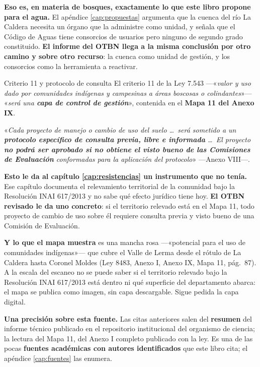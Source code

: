 \textbf{Eso es, en materia de bosques, exactamente lo que este libro propone para el agua.} El
apéndice \ref{cap:propuestas} argumenta que la cuenca del río La Caldera necesita un órgano que
la administre como unidad, y señala que el Código de Aguas tiene consorcios de usuarios pero
ninguno de segundo grado constituido. \textbf{El informe del OTBN llega a la misma conclusión
por otro camino y sobre otro recurso}: la cuenca como unidad de gestión, y los consorcios como
la herramienta a reactivar.

\begin{ficha}{Criterio 11 y protocolo de consulta}
El criterio 11 de la Ley 7.543 ---«\textit{valor y uso dado por comunidades indígenas y
campesinas a áreas boscosas o colindantes}»--- «\textit{será una \textbf{capa de control de
gestión}}», contenida en el \textbf{Mapa 11 del Anexo IX}.

«\textit{Cada proyecto de manejo o cambio de uso del suelo \ldots\ será sometido a un
\textbf{protocolo específico de consulta previa, libre e informada} \ldots\ El proyecto
\textbf{no podrá ser aprobado si no obtiene el visto bueno de las Comisiones de Evaluación}
conformadas para la aplicación del protocolo}» ---Anexo VIII---.
\end{ficha}

\begin{cautela}
\textbf{Esto le da al capítulo \ref{cap:resistencias} un instrumento que no tenía.} Ese capítulo
documenta el relevamiento territorial de la comunidad bajo la Resolución INAI 617/2013 y no
sabe qué efecto jurídico tiene hoy. \textbf{El OTBN revisado le da uno concreto}: si el
territorio relevado está en el Mapa 11, todo proyecto de cambio de uso sobre él requiere
consulta previa y visto bueno de una Comisión de Evaluación.

\textbf{Y lo que el mapa muestra} es una mancha rosa ---«potencial para el uso de comunidades
indígenas»--- que cubre el Valle de Lerma desde el rótulo de La Caldera hasta Coronel Moldes
(Ley 8483, Anexo I, Anexo IX, Mapa 11, pág.\ 87). A la escala del escaneo no se puede saber si
el territorio relevado bajo la Resolución INAI 617/2013 está dentro ni qué superficie del
departamento abarca: el mapa se publica como imagen, sin capa descargable. Sigue pedida la capa
digital.

\textbf{Una precisión sobre esta fuente.} Las citas anteriores salen del \textbf{resumen} del
informe técnico publicado en el repositorio institucional del organismo de ciencia; la lectura
del Mapa 11, del Anexo I completo publicado con la ley. Es una de las pocas \textbf{fuentes académicas con autores identificados} que este libro cita; el apéndice \ref{cap:fuentes} las enumera.
\end{cautela}


